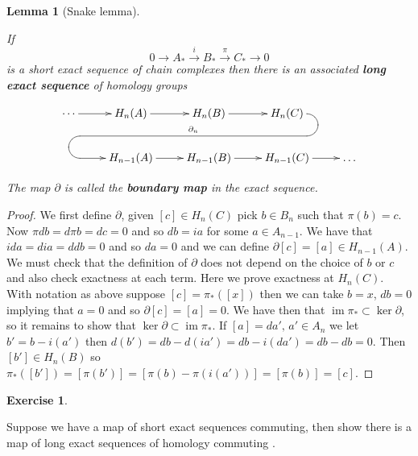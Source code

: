 \documentclass[10pt,]{book}
\newcommand{\terminology}[1]{\textbf{#1}}
\theoremstyle{plain}
\newtheorem{lemma}[theorem]{Lemma}
\theoremstyle{definition}
\newtheorem{exercise}[theorem]{Exercise}
\numberwithin{equation}{section}
\renewenvironment{figure}%
{\begin{mbxfigure}\setcounter{mbxfigure}{\value{theorem}}\stepcounter{theorem}}%
{\end{mbxfigure}}
\DeclareMathOperator{\im}{im}
\begin{document}
\begin{lemma}[Snake lemma]\label{lemma-5}

              If
              \[
                0 \to A_* \xrightarrow i B_* \xrightarrow{\pi} C_* \to 0
              \]
              is a short exact sequence of chain complexes then there is an associated \terminology{long exact sequence} of homology groups
              \begin{figure}
\centering
\[
                  \xymatrix{ \cdots\ar[r] & H_n(A) \ar[r]&
                  H_n(B) \ar[r] & H_n(C)\ar `r[d] `[l]
                  `[llld]_{\partial_n} `[dll] [dll]\\
                  & H_{n-1}(A) \ar[r] & H_{n-1}(B)
                  \ar[r] & H_{n-1}(C)\ar[r] & {\dots} }
                \]\end{figure}

              The map \(\partial\) is called the \terminology{boundary map} in the exact sequence.
            \end{lemma}
\begin{proof}

              We first define \(\partial\), given \([c] \in H_n(C)\) pick \(b\in B_n\) such that \(\pi(b) = c\).
              Now \(\pi db = d\pi b = dc = 0\) and so \(db = ia\) for some \(a \in A_{n-1}\).
              We have that \(ida = dia = ddb = 0\) and so \(da = 0\) and we can define \(\partial [c] = [a] \in H_{n-1} (A)\). \newline{}
              We must check that the definition of \(\partial\) does not depend on the choice of \(b\) or \(c\) and also check exactness at each term.
              Here we prove exactness at \(H_n(C)\).
              With notation as above suppose \([c] = \pi_*([x])\) then we can take \(b = x\), \(db = 0\) implying that \(a =0\) and so \(\partial [c] = [a] = 0\).
              We have then that \(\im \pi_* \subset \ker \partial\), so it remains to show that \(\ker \partial\subset \im \pi_*\).
              If \([a] = da',\,a'\in A_n\) we let \(b' = b - i(a')\) then \(d(b') = db - d(ia') = db - i(da') = db - db = 0\).
              Then \([b'] \in H_n(B)\) so \(\pi_*([b']) = [\pi(b')] = [\pi(b) - \pi(i(a'))] = [\pi(b)] = [c]\).
            \end{proof}
\begin{exercise}\label{exercise-3}

              Suppose we have a map of short exact sequences  commuting, then show there is a map of long exact sequences of homology commuting .
            \end{exercise}
\end{document}
